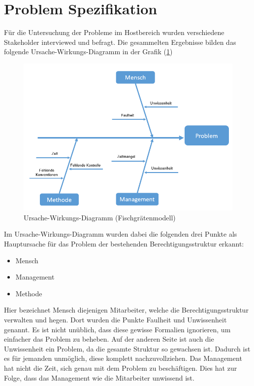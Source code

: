 \section{Problem Spezifikation}
\label{sec:intro:UWD}
Für die Untersuchung der Probleme im Hostbereich wurden verschiedene Stakeholder interviewed und befragt.
Die gesammelten Ergebnisse bilden das folgende Ursache-Wirkungs-Diagramm in der Grafik (\ref{fig:Fisch})
\begin{figure}[h!]
 \centering
 \includegraphics[width=1\textwidth]{gfx/Picture/Fisch.PNG}
 \caption{Ursache-Wirkungs-Diagramm (Fischgrätenmodell)}
 \label{fig:Fisch}
\end{figure}
Im Ursache-Wirkungs-Diagramm wurden dabei die folgenden drei Punkte als Hauptursache für das Problem der bestehenden Berechtigungsstruktur erkannt:
\begin{itemize}
	\item Mensch
	\item Management
	\item Methode
\end{itemize}
Hier bezeichnet Mensch diejenigen Mitarbeiter, welche die Berechtigungsstruktur verwalten und hegen.
Dort wurden die Punkte Faulheit und Unwissenheit genannt.
Es ist nicht unüblich, dass diese gewisse Formalien ignorieren, um einfacher das Problem zu beheben.
Auf der anderen Seite ist auch die Unwissenheit ein Problem, da die gesamte Struktur so gewachsen ist.
Dadurch ist es für jemanden unmöglich, diese komplett nachzuvollziehen.
\newline
Das Management hat nicht die Zeit, sich genau mit dem Problem zu beschäftigen.
Dies hat zur Folge, dass das Management wie die Mitarbeiter unwissend ist.
